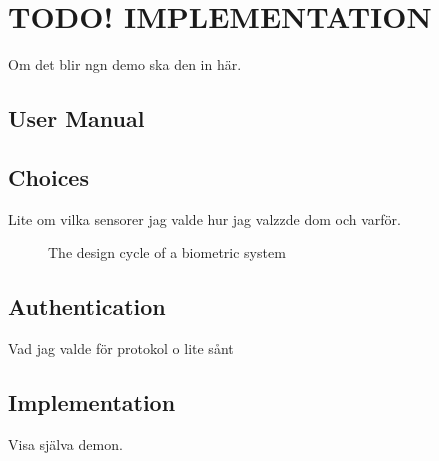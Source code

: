 \chapter{\textbf{TODO! }IMPLEMENTATION}\label{cha:demo}
Om det blir ngn demo ska den in här.

\section{User Manual}\label{manual}

\section{Choices}
Lite om vilka sensorer jag valde hur jag valzzde dom och varför.
\begin{figure}[!ht]
	
	\caption{\label{fig:appDesign} The design cycle of a biometric system}
\end{figure}

\section{Authentication}
Vad jag valde för protokol o lite sånt

\section{Implementation}
Visa själva demon.



